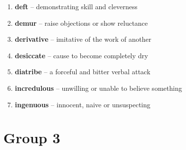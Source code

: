\begin{enumerate}[wide,labelindent=0pt]
\item \textbf{deft} -- demonstrating skill and cleverness
\item \textbf{demur} -- raise objections or show reluctance
\item \textbf{derivative} -- imitative of the work of another
\item \textbf{desiccate} -- cause to become completely dry
\item \textbf{diatribe} -- a forceful and bitter verbal attack
\item \textbf{incredulous} -- unwilling or unable to believe something
\item \textbf{ingenuous} -- innocent, naive or unsuspecting
\end{enumerate}

\newpage
\section{Group 3}


